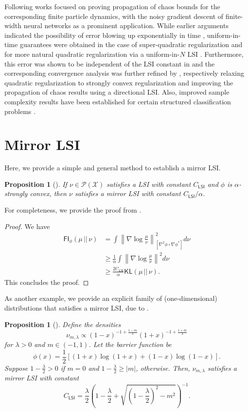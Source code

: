 \documentclass{article}
\newtheorem{proposition}[theorem]{Proposition}
\newcommand{\CLSI}[0]{C_{\mathsf{LSI}}}
\newcommand{\sep}[0]{\,||\,}
\newcommand{\KL}[0]{\mathsf{KL}}
\newcommand{\FI}[0]{\mathsf{FI}}
\begin{document}
Following works focused on proving propagation of chaos bounds for the corresponding finite particle dynamics, with the noisy gradient descent of finite-width neural networks as a prominent application. While earlier arguments indicated the possibility of error blowing up exponentially in time \citep{mei2018meanfield}, uniform-in-time guarantees were obtained in the case of super-quadratic regularization \citep{suzuki2023uniformintime} and for more natural quadratic regularization \citep{chen2023uniform,suzuki2023meanfield,kook2024} via a uniform-in-$N$ LSI \citep{wang2024,chewi2024uniform}. Furthermore, this error was shown to be independent of the LSI constant in \citet{nitanda2024improved} and the corresponding convergence analysis was further refined by \citet{chewi2024uniform,nitanda2025}, respectively relaxing quadratic regularization to strongly convex regularization and improving the propagation of chaos results using a directional LSI. Also, improved sample complexity results have been established for certain structured classification problems \citep{suzuki2023feature,mousavi-hosseini2025learning}.


\section{Mirror LSI}\label{app:mlsi}
Here, we provide a simple and general method to establish a mirror LSI.
\begin{proposition}[\citet{Daaloul25}]\label{prop:mirror_lsi}
    If $\nu\in\mathcal{P}(\mathcal{X})$ satisfies a LSI with constant $\CLSI$ and $\phi$ is $\alpha$-strongly convex, then $\nu$ satisfies a mirror LSI with constant $\CLSI/\alpha$.
\end{proposition}
For completeness, we provide the proof from \citep{Daaloul25}.
\begin{proof}
    We have \begin{align*}
        \FI_\phi(\mu\sep\nu) &= \int\left\|\nabla\log \frac{\mu}{\nu}\right\|_{[\nabla^2\phi \circ \nabla \phi^*]}^2d\nu\\
        &\ge \frac{1}{\alpha}\int \left\|\nabla\log \frac{\mu}{\nu}\right\|^2d\nu\\
        &\ge \frac{2\CLSI}{\alpha}\KL(\mu\sep\nu).
    \end{align*}
    This concludes the proof.
\end{proof}

As another example, we provide an explicit family of (one-dimensional) distributions that satisfies a mirror LSI, due to \citet{Furioli19}.
\begin{proposition}[{\citet[Theorem 3]{Furioli19}}]
Define the densities \[
\nu_{m,\lambda}\propto (1-x)^{-1+\frac{1-m}{\lambda}}(1+x)^{-1+\frac{1+m}{\lambda}}
\]
for $\lambda>0$ and $m\in(-1,1)$. Let the barrier function be \[
\phi(x) = \frac{1}{2}[(1+x)\log(1+x)+(1-x)\log(1-x)].
\]
Suppose $1 - \frac{\lambda}{2}>0$ if $m = 0$ and $1-\frac{\lambda}{2}\ge |m|$, otherwise. Then, $\nu_{m,\lambda}$ satisfies a mirror LSI with constant \[
\CLSI = \frac{\lambda}{2}\left(1-\frac{\lambda}{2}+\sqrt{\left(1-\frac{\lambda}{2}\right)^2-m^2}\right)^{-1}.
\]
\end{proposition}
\end{document}
